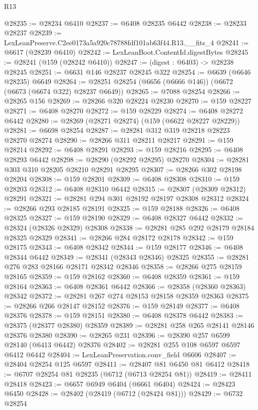 \begin{lexlean}{R13}
\begin{coremodule}
@28235 := @28234 @6410
@28237 := @6408 @28235 @6442
@28238 := @28233 @28237
@28239 := LexLeanPreserve.C2ee0173a5a920c78788fdf101ab63f44.R13.__fits_4
@28241 := @6617 (@28239 @6410)
@28242 := LexLeanBoot.ContentId.digestBytes
@28245 := @28241 (@159 (@28242 @6410))
@28247 := (digest : @6403) -> @28238 @28245
@28251 := @6631 @146 @28237 @28245 @322
@28254 := @6639 (@6646 @28235) @6649
@28264 := @28251 @28254 (@6656 (@6666 @146)) (@6672 (@6673 (@6674 @322) @28237 @6649))
@28265 := @7088 @28254
@28266 := @28265 @156
@28269 := @28266 @320 @28224 @28230
@28270 := @159 @28227
@28271 := @6408 @28270
@28272 := @159 @28229
@28274 := @6408 @28272 @6442
@28280 := @28269 (@28271 @28274) (@159 (@6622 @28227 @28229))
@28281 := @6698 @28254
@28287 := @28281 @312 @319 @28218 @28223 @28270 @28274
@28290 := @28266 @311 @28211 @28217
@28291 := @159 @28214
@28292 := @6408 @28291
@28293 := @159 @28216
@28295 := @6408 @28293 @6442
@28298 := @28290 (@28292 @28295) @28270
@28304 := @28281 @303 @310 @28205 @28210 @28291 @28295
@28307 := @28266 @302 @28198 @28204
@28308 := @159 @28201
@28309 := @6408 @28308
@28310 := @159 @28203
@28312 := @6408 @28310 @6442
@28315 := @28307 (@28309 @28312) @28291
@28321 := @28281 @294 @301 @28192 @28197 @28308 @28312
@28324 := @28266 @293 @28185 @28191
@28325 := @159 @28188
@28326 := @6408 @28325
@28327 := @159 @28190
@28329 := @6408 @28327 @6442
@28332 := @28324 (@28326 @28329) @28308
@28338 := @28281 @285 @292 @28179 @28184 @28325 @28329
@28341 := @28266 @284 @28172 @28178
@28342 := @159 @28175
@28343 := @6408 @28342
@28344 := @159 @28177
@28346 := @6408 @28344 @6442
@28349 := @28341 (@28343 @28346) @28325
@28355 := @28281 @276 @283 @28166 @28171 @28342 @28346
@28358 := @28266 @275 @28159 @28165
@28359 := @159 @28162
@28360 := @6408 @28359
@28361 := @159 @28164
@28363 := @6408 @28361 @6442
@28366 := @28358 (@28360 @28363) @28342
@28372 := @28281 @267 @274 @28153 @28158 @28359 @28363
@28375 := @28266 @266 @28147 @28152
@28376 := @159 @28149
@28377 := @6408 @28376
@28378 := @159 @28151
@28380 := @6408 @28378 @6442
@28383 := @28375 (@28377 @28380) @28359
@28389 := @28281 @258 @265 @28141 @28146 @28376 @28380
@28390 := @28265 @231
@28396 := @28390 @257 @6599 @28140 (@6413 @6442) @28376
@28402 := @28281 @255 @108 @6597 @6597 @6412 @6442
@28404 := LexLeanPreservation.conv_field @6606
@28407 := @28404 @28254 @125 @6597
@28411 := @28407 @81 @6450 @81 @6412
@28418 := @6707 @28254 @81 @28235 (@6712 (@6713 @28254 @81))
@28419 := @28411 @28418
@28423 := @6657 @6949 @6404 (@6661 @6404)
@28424 := @28423 @6450
@28428 := @28402 (@28419 (@6712 (@28424 @81)))
@28429 := @6732 @28254

\end{coremodule}
\end{lexlean}
